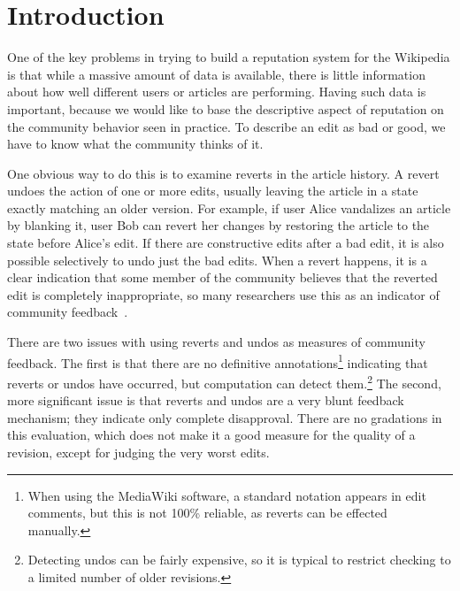 \section{Introduction}

One of the key problems in trying to build a reputation system
for the Wikipedia is that while a massive amount of
data is available, there is little information about how well different
users or articles are performing.
Having such data is important, because we would like to base the
descriptive aspect of reputation on the community behavior seen
in practice.
To describe an edit as bad or good, we have to know what the
community thinks of it.

One obvious way to do this is to examine reverts
in the article history.
A revert undoes the action of one or more edits, usually leaving
the article in a state exactly matching an older version.
For example, if user Alice vandalizes an article by blanking it,
user Bob can revert her changes by restoring the article to the
state before Alice's edit.
If there are constructive edits after a bad edit, it is also possible
selectively to undo just the bad edits.
When a revert happens, it is a clear indication that some member
of the community believes that the reverted edit is completely
inappropriate, so many researchers use this as an indicator of
community feedback~\cite{Adler2007,Smets2008,Itakura2009,Belani2010}.

There are two issues with using reverts and undos
as measures of community feedback.
The first is that there are no definitive
annotations\footnote{When using the MediaWiki software,
a standard notation appears in edit comments,
but this is not 100\% reliable, as reverts can be effected manually.}
indicating that reverts or undos have occurred,
but computation can detect
them.\footnote{Detecting undos can be fairly expensive, so
it is typical to restrict checking to a limited number of older revisions.}
The second, more significant issue is that reverts and undos
are a very blunt feedback mechanism; they indicate only complete disapproval.
There are no gradations in this evaluation, which does not make
it a good measure for the quality of a revision, except for judging the very
worst edits.

